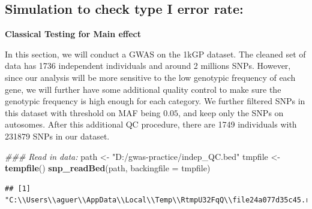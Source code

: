 \documentclass[
]{article}
\newenvironment{Shaded}{\begin{snugshade}}{\end{snugshade}}
\newcommand{\CommentTok}[1]{\textcolor[rgb]{0.56,0.35,0.01}{\textit{#1}}}
\newcommand{\DataTypeTok}[1]{\textcolor[rgb]{0.13,0.29,0.53}{#1}}
\newcommand{\DecValTok}[1]{\textcolor[rgb]{0.00,0.00,0.81}{#1}}
\newcommand{\KeywordTok}[1]{\textcolor[rgb]{0.13,0.29,0.53}{\textbf{#1}}}
\newcommand{\NormalTok}[1]{#1}
\newcommand{\OperatorTok}[1]{\textcolor[rgb]{0.81,0.36,0.00}{\textbf{#1}}}
\newcommand{\StringTok}[1]{\textcolor[rgb]{0.31,0.60,0.02}{#1}}
\begin{document}
\hypertarget{simulation-to-check-type-i-error-rate}{%
\subsection{Simulation to check type I error
rate:}\label{simulation-to-check-type-i-error-rate}}

\textbf{Classical Testing for Main effect}

In this section, we will conduct a GWAS on the 1kGP dataset. The cleaned
set of data has 1736 independent individuals and around 2 millions SNPs.
However, since our analysis will be more sensitive to the low genotypic
frequency of each gene, we will further have some additional quality
control to make sure the genotypic frequency is high enough for each
category. We further filtered SNPs in this dataset with threshold on MAF
being \(0.05\), and keep only the SNPs on autosomes. After this
additional QC procedure, there are 1749 individuals with 231879 SNPs in
our dataset.

\begin{Shaded}
\begin{Highlighting}[]
\CommentTok{### Read in data:}
\NormalTok{path <-}\StringTok{ "D:/gwas-practice/indep_QC.bed"}
\NormalTok{tmpfile  <-}\StringTok{ }\KeywordTok{tempfile}\NormalTok{()}
\KeywordTok{snp_readBed}\NormalTok{(path, }\DataTypeTok{backingfile =}\NormalTok{ tmpfile)}
\end{Highlighting}
\end{Shaded}

\begin{verbatim}
## [1] "C:\\Users\\aguer\\AppData\\Local\\Temp\\RtmpU32FqQ\\file24a077d35c45.rds"
\end{verbatim}

\begin{Shaded}
\end{Shaded}
\end{document}
